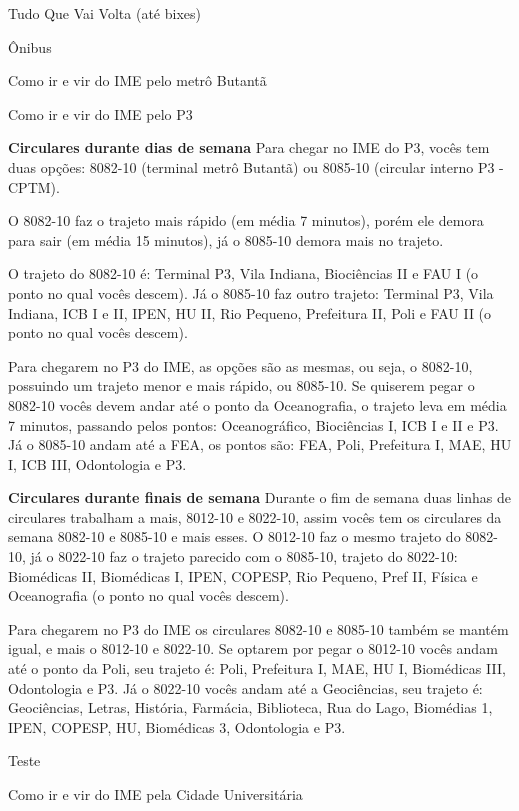 \begin{secao}{Tudo Que Vai Volta (até bixes)}
\begin{subsecao}{Ônibus}
\begin{subsubsecao}{Como ir e vir do IME pelo metrô Butantã}
\end{subsubsecao}

\begin{subsubsecao}{Como ir e vir do IME pelo P3}

{\bf Circulares durante dias de semana}
Para chegar no IME do P3, vocês tem duas opções: 8082-10 (terminal metrô 
Butantã) ou 8085-10 (circular interno P3 - CPTM). 

O 8082-10 faz o trajeto mais rápido (em média 7 minutos), porém ele demora para sair 
(em média 15 minutos), já o 8085-10 demora mais no trajeto.

O trajeto do 8082-10 é: Terminal P3, Vila Indiana, Biociências II e FAU I
(o ponto no qual vocês descem). Já o 8085-10 faz outro trajeto: Terminal P3,
Vila Indiana, ICB I e II, IPEN, HU II, Rio Pequeno, Prefeitura II, Poli e FAU II
(o ponto no qual vocês descem).

Para chegarem no P3 do IME, as opções são as mesmas, ou seja, o 8082-10, possuindo 
um trajeto menor e mais rápido, ou 8085-10. Se quiserem pegar o 8082-10 vocês 
devem andar até o ponto da Oceanografia, o trajeto leva em média 7 minutos, 
passando pelos pontos: Oceanográfico, Biociências I, ICB I e II e P3. 
Já o 8085-10 andam até a FEA, os pontos são: FEA, Poli, Prefeitura I, MAE, 
HU I, ICB III, Odontologia e P3.

{\bf Circulares durante finais de semana}
Durante o fim de semana duas linhas de circulares trabalham a mais, 8012-10 e 8022-10,
assim vocês tem os circulares da semana 8082-10 e 8085-10 e mais esses.
O 8012-10 faz o mesmo trajeto do 8082-10, já o 8022-10 faz o trajeto parecido com
o 8085-10, trajeto do 8022-10: Biomédicas II, Biomédicas I, IPEN, COPESP, Rio 
Pequeno, Pref II, Física e Oceanografia (o ponto no qual vocês descem).

Para chegarem no P3 do IME os circulares 8082-10 e 8085-10 também se mantém igual, 
e mais o 8012-10 e 8022-10. Se optarem por pegar o 8012-10 vocês andam até o ponto da Poli, 
seu trajeto é: Poli, Prefeitura I, MAE, HU I, Biomédicas III, Odontologia e P3. Já o 8022-10 
vocês andam até a Geociências, seu trajeto é: Geociências, Letras, História, Farmácia, 
Biblioteca, Rua do Lago, Biomédias 1, IPEN, COPESP, HU, Biomédicas 3, Odontologia e P3.

Teste

\end{subsubsecao}

\begin{subsubsecao}{Como ir e vir do IME pela Cidade Universitária}


\end{subsubsecao}
\end{subsecao}
\end{secao}
